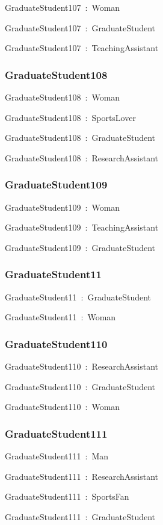 \documentclass{article}
\begin{document}
GraduateStudent107~:~Woman

GraduateStudent107~:~GraduateStudent

GraduateStudent107~:~TeachingAssistant

\subsubsection*{GraduateStudent108}

GraduateStudent108~:~Woman

GraduateStudent108~:~SportsLover

GraduateStudent108~:~GraduateStudent

GraduateStudent108~:~ResearchAssistant

\subsubsection*{GraduateStudent109}

GraduateStudent109~:~Woman

GraduateStudent109~:~TeachingAssistant

GraduateStudent109~:~GraduateStudent

\subsubsection*{GraduateStudent11}

GraduateStudent11~:~GraduateStudent

GraduateStudent11~:~Woman

\subsubsection*{GraduateStudent110}

GraduateStudent110~:~ResearchAssistant

GraduateStudent110~:~GraduateStudent

GraduateStudent110~:~Woman

\subsubsection*{GraduateStudent111}

GraduateStudent111~:~Man

GraduateStudent111~:~ResearchAssistant

GraduateStudent111~:~SportsFan

GraduateStudent111~:~GraduateStudent
\end{document}
